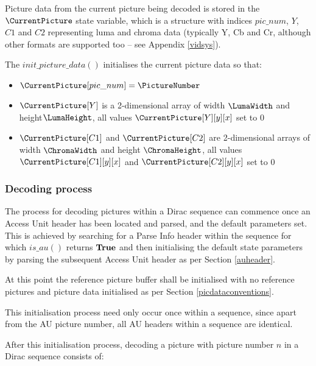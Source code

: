 Picture data from the current picture being decoded is stored in the $\CurrentPicture$ state
variable, which is a structure with indices $pic\_num$, $Y$, $C1$ and $C2$ representing
luma and chroma data (typically Y, Cb and Cr, although other formats are supported too -- see
Appendix \ref{vidsys}).


The $init\_picture\_data()$ initialises the current picture data so that:
\begin{itemize}
\item $\CurrentPicture[pic\_num]=\PictureNumber$
\item $\CurrentPicture[Y]$ is a 2-dimensional array of width $\LumaWidth$ and height$\LumaHeight$, 
all values $\CurrentPicture[Y][y][x]$ set to 0
\item $\CurrentPicture[C1]$ and $\CurrentPicture[C2]$ are 2-dimensional arrays of width $\ChromaWidth$ and height $\ChromaHeight$, 
all values $\CurrentPicture[C1][y][x]$ and $\CurrentPicture[C2][y][x]$ set to 0
\end{itemize}

\subsubsection{Decoding process}
\label{picturedecprocess}

The process for decoding pictures within a Dirac sequence can commence 
once an Access Unit header has been
located and parsed, and the default parameters set. This is achieved by 
searching for a Parse Info header within the sequence for which
$is\_au()$ returns $\text{\bf{True}}$ and then initialising the default state parameters
 by parsing the subsequent Access Unit header as per Section \ref{auheader}.

At this point the reference picture buffer shall be initialised with no 
reference pictures and picture data initialised as per Section \ref{picdataconventions}.

This initialisation process need only occur once within a sequence, since
apart from the AU picture number, all AU headers within a sequence are
identical. 

After this initialisation process, decoding a picture with picture number 
$n$ in a Dirac sequence consists of:

